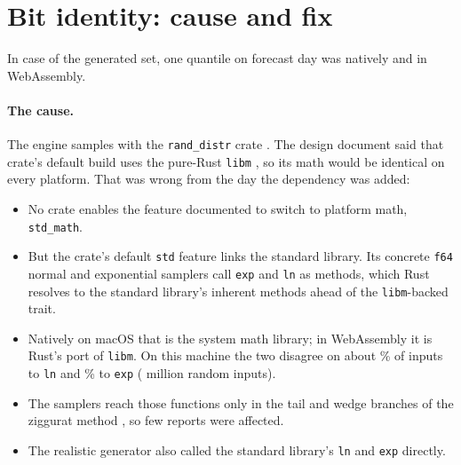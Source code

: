 \begin{table}[h]
\centering\footnotesize
{}
\caption{MoneyData, one account,  weekly
origins: point estimates only, because one account cannot be bootstrapped
by account. Skill is the pooled ratio over the account's origins. V2's
sparse rule never fired, so V2 equals V0.}
\label{tab:moneydata}
\end{table}

\section{Bit identity: cause and fix}
\label{app:identity}
In case  of the generated set, one quantile on forecast day
 was \texttt{} natively and
\texttt{} in WebAssembly.

\paragraph{The cause.} The engine samples with the \texttt{rand\_distr}
crate \citep{rand_distr_crate}. The design document said that crate's
default build uses the pure-Rust \texttt{libm} \citep{libm_crate}, so its
math would be identical on every platform. That was wrong from the day the
dependency was added:
\begin{itemize}
\item No crate enables the feature documented to switch to platform
  math, \texttt{std\_math}.
\item But the crate's default \texttt{std} feature links the standard
  library. Its concrete \texttt{f64} normal and exponential samplers call
  \texttt{exp} and \texttt{ln} as methods, which Rust resolves to the
  standard library's inherent methods ahead of the \texttt{libm}-backed
  trait.
\item Natively on macOS that is the system math library; in WebAssembly
  it is Rust's port of \texttt{libm}. On this machine the two disagree on
  about \% of inputs to \texttt{ln} and
  \% to \texttt{exp} ( million random
  inputs).
\item The samplers reach those functions only in the tail and wedge
  branches of the ziggurat method \citep{marsaglia2000ziggurat}, so few
  reports were affected.
\item The realistic generator also called the standard library's
  \texttt{ln} and \texttt{exp} directly.
\end{itemize}

